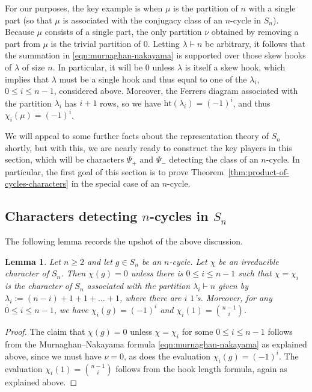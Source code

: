 \documentclass[12pt]{amsart}
\newtheorem{lemma}[theorem]{Lemma}
\theoremstyle{definition} \newtheorem{definition}[theorem]{Definition}
\theoremstyle{example} \newtheorem{example}[theorem]{Example}
\theoremstyle{remark} \newtheorem{remark}{Remark}[theorem]
\numberwithin{equation}{section}
\numberwithin{theorem}{section}
\renewcommand{\leq}{\leqslant}
\renewcommand{\geq}{\geqslant}
\begin{document}
	For our purposes, the key example is when $\mu$ is the partition of $n$ with a single part (so that $\mu$ is associated with the conjugacy class of an $n$-cycle in $S_n$).  Because $\mu$ consists of a single part, the only partition $\nu$ obtained by removing a part from $\mu$ is the trivial partition of $0$.  Letting $\lambda \vdash n$ be arbitrary, it follows that the summation in \eqref{eqn:murnaghan-nakayama} is supported over those skew hooks of $\lambda$ of size $n$.  In particular, it will be $0$ unless $\lambda$ is itself a skew hook, which implies that $\lambda$ must be a single hook and thus equal to one of the $\lambda_i$, $0 \leq i \leq n-1$, considered above.  Moreover, the Ferrers diagram associated with the partition $\lambda_i$ has $i+1$ rows, so we have $\mathrm{ht}(\lambda_i) = (-1)^i$, and thus $\chi_i(\mu) = (-1)^i$.
	
	We will appeal to some further facts about the representation theory of $S_n$ shortly, but with this, we are nearly ready to construct the key players in this section, which will be characters $\Psi_+$ and $\Psi_-$ detecting the class of an $n$-cycle.  In particular, the first goal of this section is to prove Theorem~\ref{thm:product-of-cycles-characters} in the special case of an $n$-cycle.
	
\subsection{Characters detecting $n$-cycles in $S_n$}

	The following lemma records the upshot of the above discussion.
	
	\begin{lemma} \label{lem:n-cycle-evaluation}
		Let $n \geq 2$ and let $g \in S_n$ be an $n$-cycle.  Let $\chi$ be an irreducible character of $S_n$.  
		Then $\chi(g) = 0$ unless there is $0 \leq i \leq n-1$ such that $\chi = \chi_i$ is the character of $S_n$ associated with the partition $\lambda_i \vdash n$ given by $\lambda_i := (n-i) + 1 + 1 + \dots + 1$, where there are $i$ $1$'s.  Moreover, for any $0 \leq i \leq n-1$, we have $\chi_i(g) = (-1)^i$ and $\chi_i(1) = \binom{n-1}{i}$.
	\end{lemma}
	\begin{proof}
		The claim that $\chi(g) = 0$ unless $\chi = \chi_i$ for some $0 \leq i \leq n-1$ follows from the Murnaghan--Nakayama formula \eqref{eqn:murnaghan-nakayama} as explained above, since we must have $\nu = 0$, as does the evaluation $\chi_i(g) = (-1)^i$.  The evaluation $\chi_i(1) = \binom{n-1}{i}$ follows from the hook length formula, again as explained above.
	\end{proof}
	
\end{document}
